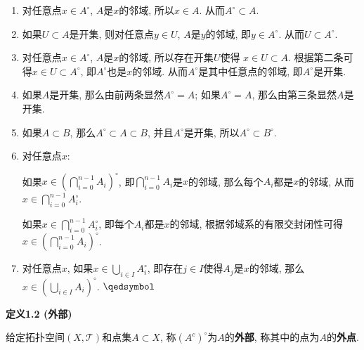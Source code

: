 \begin{enumerate}
    \item 对任意点$x\in A^\circ$, $A$是$x$的邻域, 所以$x\in A$.
    从而$A^\circ\subset A$.
    \item 如果$U\subset A$是开集,
    则对任意点$y\in U$, $A$是$y$的邻域, 即$y\in A^\circ$. 从而$U\subset A^\circ$.
    \item 对任意点$x\in A^\circ$, $A$是$x$的邻域, 所以存在开集$U$使得
    $x\in U\subset A$. 根据第二条可得$x\in U\subset A^\circ$,
    即$A^\circ$也是$x$的邻域. 从而$A^\circ$是其中任意点的邻域, 即$A^\circ$是开集.
    \item 如果$A$是开集, 那么由前两条显然$A^\circ=A$;
    如果$A^\circ=A$, 那么由第三条显然$A$是开集.
    \item 如果$A\subset B$, 那么$A^\circ\subset A\subset B$,
    并且$A^\circ$是开集, 所以$A^\circ\subset B^\circ$.
    \item 对任意点$x$:
    
    \vspace{3pt}\hspace{2.17em}
    如果$\displaystyle x\in\left(\bigcap_{i=0}^{n-1}A_i\right)^\circ$,
    即$\displaystyle\bigcap_{i=0}^{n-1}A_i$是$x$的邻域,
    那么每个$A_i$都是$x$的邻域, 从而$\displaystyle x\in\bigcap_{i=0}^{n-1}A_i^\circ$.
    
    \vspace{3pt}\hspace{2.17em}
    如果$\displaystyle x\in\bigcap_{i=0}^{n-1}A_i^\circ$,
    即每个$A_i$都是$x$的邻域, 根据邻域系的有限交封闭性可得
    $\displaystyle x\in\left(\bigcap_{i=0}^{n-1}A_i\right)^\circ$.

    \vspace{5pt}
    \item 对任意点$x$, 如果$\displaystyle x\in\bigcup_{i\in I}A_i^\circ$,
    即存在$j\in I$使得$A_j$是$x$的邻域, 那么
    $\displaystyle x\in\left(\bigcup_{i\in I}A_i\right)^\circ$.
    \hfill $\qedsymbol$
\end{enumerate}

\vspace{10pt}

\hypertarget{sec:定义1.2}{}
\noindent\textbf{定义1.2 (外部)}

给定拓扑空间$(X,\mathcal{T})$和点集$A\subset X$,
称$(A^c)^\circ$为$A$的\textbf{外部}, 称其中的点为$A$的\textbf{外点}.





\newpage

